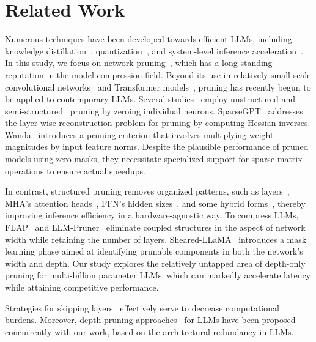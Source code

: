 \section{Related Work} \label{relwork}

Numerous techniques have been developed towards efficient LLMs, including knowledge distillation~\cite{fu2023specializing,hsieh2023distilling}, quantization~\cite{frantar2023optq,dettmers2022llmint8}, and system-level inference acceleration~\cite{dao2023flashattention2,kwon2023efficient}. In this study, we focus on network pruning~\cite{lecun1989optimal}, which has a long-standing reputation in the model compression field. Beyond its use in relatively small-scale convolutional networks~\cite{li2016pruning,he2019filter} and Transformer models~\cite{yu2022unified,xia2022structured,kurtic2023ziplm}, pruning has recently begun to be applied to contemporary LLMs. Several studies~\cite{frantar-sparsegpt,wanda} employ unstructured and semi-structured~\cite{zhou2021} pruning by zeroing individual neurons. SparseGPT~\cite{frantar-sparsegpt} addresses the layer-wise reconstruction problem for pruning by computing Hessian inverses. Wanda~\cite{wanda} introduces a pruning criterion that involves multiplying weight magnitudes by input feature norms. Despite the plausible performance of pruned models using zero masks, they necessitate specialized support for sparse matrix operations to ensure actual speedups.

In contrast, structured pruning removes organized patterns, such as layers~\cite{fan2019reducing,jha2023train}, MHA's attention heads~\cite{voita2019analyzing,michel2019sixteen}, FFN's hidden sizes~\cite{nova2023gradientfree,santacroce2023matters}, and some hybrid forms~\cite{lagunas2021block,xia2022structured,kwon2022fast,kurtic2023ziplm}, thereby improving inference efficiency in a hardware-agnostic way. To compress LLMs, FLAP~\cite{flap} and LLM-Pruner~\cite{llmpruner} eliminate coupled structures in the aspect of network width while retaining the number of layers. Sheared-LLaMA~\cite{xia2023sheared} introduces a mask learning phase aimed at identifying prunable components in both the network's width and depth. Our study explores the relatively untapped area of depth-only pruning for multi-billion parameter LLMs, which can markedly accelerate latency while attaining competitive performance.

Strategies for skipping layers~\cite{schuster2022confident,delcorro2023skipdecode,raposo2024mixtureofdepths} effectively serve to decrease computational burdens. Moreover, depth pruning approaches~\cite{song2024sleb,men2024shortgpt,tang2024rethinking} for LLMs have been proposed concurrently with our work, based on the architectural redundancy in LLMs.

